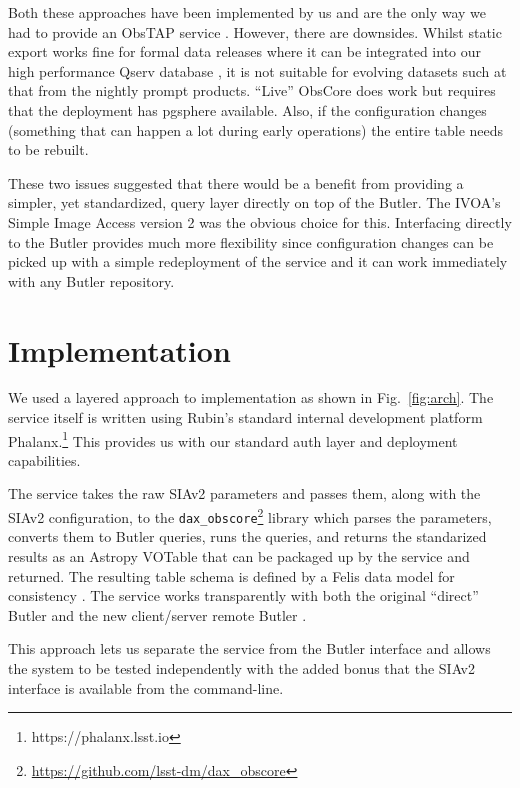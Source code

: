 \documentclass[11pt,twoside]{article}
\begin{document}
Both these approaches have been implemented by us and are the only way we had to provide an ObsTAP service \citep{2017ivoa.spec.0509L}.
However, there are downsides.
Whilst static export works fine for formal data releases where it can be integrated into our high performance Qserv database \citep{C15_adassxxxii}, it is not suitable for evolving datasets such at that from the nightly prompt products.
``Live'' ObsCore does work but requires that the deployment has pgsphere available.
Also, if the configuration changes (something that can happen a lot during early operations) the entire table needs to be rebuilt.

These two issues suggested that there would be a benefit from providing a simpler, yet standardized, query layer directly on top of the Butler.
The IVOA's Simple Image Access version 2 \citep[SIAv2;][]{2015ivoa.spec.1223D} was the obvious choice for this.
Interfacing directly to the Butler provides much more flexibility since configuration changes can be picked up with a simple redeployment of the service and it can work immediately with any Butler repository.

\section{Implementation}


We used a layered approach to implementation as shown in Fig.\ \ref{fig:arch}.
The service itself \citep{SQR-095} is written using Rubin's standard internal development platform Phalanx.\footnote{https://phalanx.lsst.io}
This provides us with our standard auth layer and deployment capabilities.

The service takes the raw SIAv2 parameters and passes them, along with the SIAv2 configuration, to the \texttt{dax\_obscore}\footnote{\url{https://github.com/lsst-dm/dax_obscore}} library which parses the parameters, converts them to Butler queries, runs the queries, and returns the standarized results as an Astropy VOTable that can be packaged up by the service and returned.
The resulting table schema is defined by a Felis data model for consistency \citep{C702_adassxxxiv}.
The service works transparently with both the original ``direct'' Butler and the new client/server remote Butler \citep{2024SPIE13101E..3GJ}.

This approach lets us separate the service from the Butler interface and allows the system to be tested independently with the added bonus that the SIAv2 interface is available from the command-line.
\end{document}
